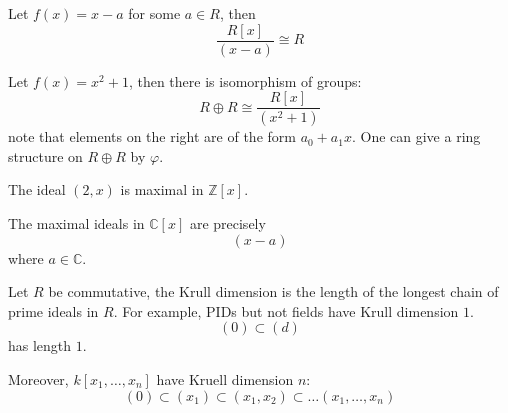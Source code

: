 \documentclass[openany]{book}
\newcommand{\Z}{\mathbb{Z}}
\newcommand{\C}{\mathbb{C}}
\begin{document}
\begin{example}
    Let $f(x)=x-a$ for some $a\in R$, then 
    \begin{equation*}
        \frac{R[x]}{(x-a)}\cong R
    \end{equation*}
\end{example}
\begin{example}
    Let $f(x)=x^2+1$, then there is isomorphism of groups:
    \begin{equation*}
        R\oplus R\cong\frac{R[x]}{(x^2+1)}
    \end{equation*}
    note that elements on the right are of the form $a_0+a_1x$. One can give a ring structure on $R\oplus R$ by $\varphi$.
\end{example}

\begin{example}
    The ideal $(2,x)$ is maximal in $\Z[x]$.
\end{example}

\begin{example}
    The maximal ideals in $\C[x]$ are precisely 
    \begin{equation*}
        (x-a)
    \end{equation*}
    where $a\in\C$.
\end{example}

\begin{defn}
    Let $R$ be commutative, the Krull dimension is the length of the longest chain of prime ideals in $R$. For example, PIDs but not fields have Krull dimension $1$. 
    \begin{equation*}
        (0)\subset (d)
    \end{equation*}
    has length $1$.

    Moreover, $k[x_1,\dots,x_n]$ have Kruell dimension $n$:
    \begin{equation*}
        (0)\subset (x_1)\subset(x_1,x_2)\subset\dots(x_1,\dots,x_n)
    \end{equation*}
\end{defn}
\end{document}
